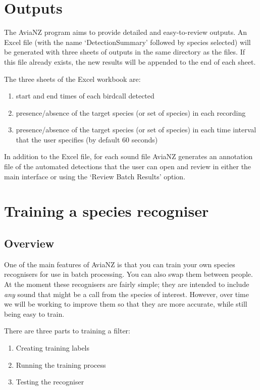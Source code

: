 \documentclass{article}
\begin{document}
\section{Outputs}
\label{sec:outputs}

The AviaNZ program aims to provide detailed and easy-to-review outputs. An Excel file (with the name `DetectionSummary' followed by species selected) will be generated with three sheets of outputs in the same directory as the files. If this file already exists, the new results will be appended to the end of each sheet. 

The three sheets of the Excel workbook are:
\begin{enumerate}
\item start and end times of each birdcall detected
\item presence/absence of the target species (or set of species) in each recording
\item  presence/absence of the target species (or set of species) in each time interval that the user specifies (by default 60 seconds)
\end{enumerate}

In addition to the Excel file, for each sound file AviaNZ generates an annotation file of the automated detections that  the user can open and review in either the main interface or using the `Review Batch Results' option. 

\newpage
\section{Training a species recogniser}\label{sec:trainfilter}

\subsection{Overview}

One of the main features of AviaNZ is that you can train your own species recognisers for use in batch processing. You can also swap them between people. At the moment these recognisers are fairly simple; they are intended to include {\em any} sound that might be a call from the species of interest. However, over time we will be working to improve them so that they are more accurate, while still being easy to train. 

There are three parts to training a filter:

\begin{enumerate}
\item Creating training labels
\item Running the training process
\item Testing the recogniser
\end{enumerate}
\end{document}
